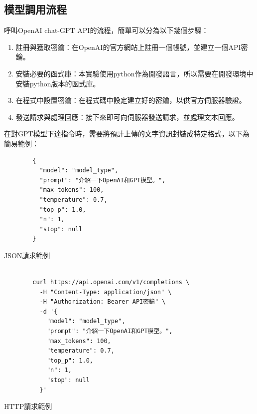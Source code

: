 \documentclass[class=NCU_thesis, crop=false]{standalone}
\begin{document}
\subsection{模型調用流程}
呼叫OpenAI chat-GPT API的流程，簡單可以分為以下幾個步驟：\\
\begin{enumerate}
    \item 註冊與獲取密鑰：在OpenAI的官方網站上註冊一個帳號，並建立一個API密鑰。
    \item 安裝必要的函式庫：本實驗使用python作為開發語言，所以需要在開發環境中安裝python版本的函式庫。
    \item 在程式中設置密鑰：在程式碼中設定建立好的密鑰，以供官方伺服器驗證。
    \item 發送請求與處理回應：接下來即可向伺服器發送請求，並處理文本回應。
\end{enumerate}
\newpage
在對GPT模型下達指令時，需要將預計上傳的文字資訊封裝成特定格式，以下為簡易範例：\\

\begin{listing}[h]
    \begin{verbatim}
        {
          "model": "model_type",
          "prompt": "介紹一下OpenAI和GPT模型。",
          "max_tokens": 100,
          "temperature": 0.7,
          "top_p": 1.0,
          "n": 1,
          "stop": null
        }
    \end{verbatim}
\caption{JSON請求範例} 
\end{listing}

\begin{listing}[h]
    \begin{verbatim}

        curl https://api.openai.com/v1/completions \
          -H "Content-Type: application/json" \
          -H "Authorization: Bearer API密鑰" \
          -d '{
            "model": "model_type",
            "prompt": "介紹一下OpenAI和GPT模型。",
            "max_tokens": 100,
            "temperature": 0.7,
            "top_p": 1.0,
            "n": 1,
            "stop": null
          }'
    \end{verbatim}
\caption{HTTP請求範例} 
\end{listing}
\end{document}

